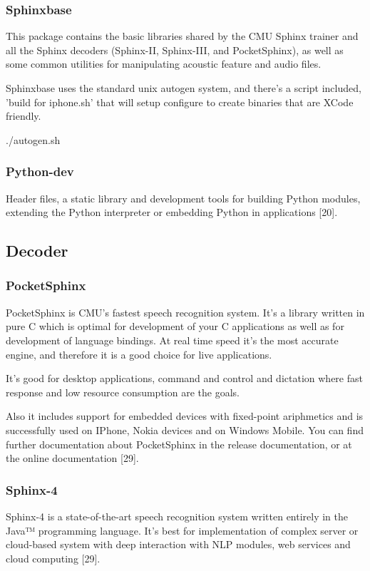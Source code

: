 \documentclass[12pt,a4paper,oneside]{memoir}
\begin{document}
\subsubsection{Sphinxbase}
This package contains the basic libraries shared by the CMU Sphinx
trainer and all the Sphinx decoders (Sphinx-II, Sphinx-III, and
PocketSphinx), as well as some common utilities for manipulating
acoustic feature and audio files.

Sphinxbase uses the standard unix autogen system, and there's a script
included, 'build for iphone.sh' that will setup configure to create
binaries that are XCode friendly.

 ./autogen.sh

\subsubsection{Python-dev}
Header files, a static library and development tools for building
 Python modules, extending the Python interpreter or embedding Python
 in applications [20].

\subsection{Decoder}
\subsubsection{PocketSphinx}
 PocketSphinx is CMU’s fastest speech recognition system. It’s a library written in pure C which is optimal for development of your C applications as well as for development of language bindings. At real time speed it’s the most accurate engine, and therefore it is a good choice for live applications.

It's good for desktop applications, command and control and dictation where fast response and low resource consumption are the goals.

Also it includes support for embedded devices with fixed-point ariphmetics and is successfully used on IPhone, Nokia devices and on Windows Mobile. You can find further documentation about PocketSphinx in the release documentation, or at the online  documentation [29]. 

\subsubsection{Sphinx-4}
Sphinx-4 is a state-of-the-art speech recognition system written entirely in the Java™ programming language. It's best for implementation of complex server or cloud-based system with deep interaction with NLP modules, web services and cloud computing [29].
\end{document}
